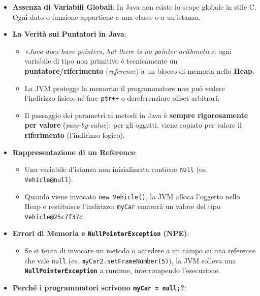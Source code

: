 \documentclass[11pt,a4paper]{article}
\newcommand{\passthrough}[1]{#1}
\providecommand{\tightlist}{\setlength{\itemsep}{0pt}\setlength{\parskip}{0pt}}
\begin{document}
\begin{itemize}
\tightlist
\item
  \textbf{Assenza di Variabili Globali}: In Java non esiste lo scope
  globale in stile C. Ogni dato o funzione appartiene a una classe o a
  un'istanza.
\item
  \textbf{La Verità sui Puntatori in Java}:

  \begin{itemize}
  \tightlist
  \item
    \emph{«Java does have pointers, but there is no pointer
    arithmetic»}: ogni variabile di tipo non primitivo è tecnicamente un
    \textbf{puntatore/riferimento} (\emph{reference}) a un blocco di
    memoria nello \textbf{Heap}.
  \item
    La JVM protegge la memoria: il programmatore non può vedere
    l'indirizzo fisico, né fare \passthrough{\lstinline!ptr++!} o
    dereferenziare offset arbitrari.
  \item
    Il passaggio dei parametri ai metodi in Java è \textbf{sempre
    rigorosamente per valore} (\emph{pass-by-value}): per gli oggetti,
    viene copiato per valore il \textbf{riferimento} (l'indirizzo
    logico).
  \end{itemize}
\item
  \textbf{Rappresentazione di un Reference}:

  \begin{itemize}
  \tightlist
  \item
    Una variabile d'istanza non inizializzata contiene
    \passthrough{\lstinline!null!} (es.
    \passthrough{\lstinline!Vehicle@null!}).
  \item
    Quando viene invocato \passthrough{\lstinline!new Vehicle()!}, la
    JVM alloca l'oggetto nello Heap e restituisce l'indirizzo:
    \passthrough{\lstinline!myCar!} conterrà un valore del tipo
    \passthrough{\lstinline!Vehicle@25c7f37d!}.
  \end{itemize}
\item
  \textbf{Errori di Memoria e
  \passthrough{\lstinline!NullPointerException!} (NPE)}:

  \begin{itemize}
  \tightlist
  \item
    Se si tenta di invocare un metodo o accedere a un campo su una
    reference che vale \passthrough{\lstinline!null!} (es.
    \passthrough{\lstinline!myCar2.setFrameNumber(5)!}), la JVM solleva
    una \textbf{\passthrough{\lstinline!NullPointerException!}} a
    runtime, interrompendo l'esecuzione.
  \end{itemize}
\item
  \textbf{Perché i programmatori scrivono
  \passthrough{\lstinline!myCar = null;!}?}:


\end{itemize}
\end{document}
